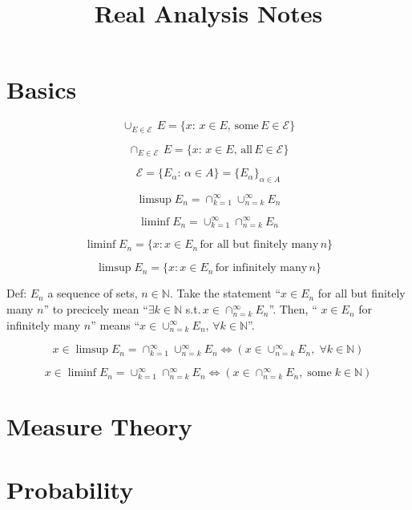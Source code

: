 \documentclass[landscape,twocolumn,letterpaper]{book}
\title{Real Analysis Notes}
\begin{document}
\chapter{Basics}

\begin{equation*}
\cup_{E \in \mathcal{E} } \, E = \{ x : \, x\in E, \, \textrm{some} \, E \in \mathcal{E}  \}
\end{equation*}

\begin{equation*}
\cap_{E \in \mathcal{E} } \, E = \{ x : \, x\in E, \, \textrm{all} \, E \in \mathcal{E}  \}
\end{equation*}

\begin{equation*}
 \mathcal{E} = \{ E_\alpha : \, \alpha \in A \} = \{E_\alpha \}_{\alpha \in A}
\end{equation*}

\begin{equation*}
\limsup E_n = \cap_{k=1}^{\infty} \cup_{n=k}^{\infty} E_n
\end{equation*}

\begin{equation*}
\liminf E_n = \cup_{k=1}^{\infty} \cap_{n=k}^{\infty} E_n
\end{equation*}

\begin{equation*}
\liminf E_n = \{ x : x \in E_n \, \textrm{for all but finitely many} \, n \}
\end{equation*}

\begin{equation*}
\limsup E_n = \{ x : x \in E_n \, \textrm{for infinitely many} \, n \}
\end{equation*}

\begin{flushleft}
Def: $E_n$ a sequence of sets, $n \in \mathbb{N}$. Take the statement ``$x \in E_n$ for all but finitely many $n$'' to precicely mean ``$\exists k \in \mathbb{N}$ s.t.$ \, x \in \cap_{n=k}^{\infty} E_n $''. Then, `` $x \in E_n$ for infinitely many $n$'' means ``$ x \in \cup_{n=k}^{\infty} E_n,\, \forall k \in \mathbb{N}$''.
\end{flushleft}

\begin{equation*}
x \in \limsup E_n = \cap_{k=1}^{\infty} \cup_{n=k}^{\infty} E_n \Leftrightarrow \left( x \in \cup_{n=k}^{\infty} E_n, \; \forall k \in \mathbb{N} \right)
\end{equation*}

\begin{equation*}
x \in \liminf E_n = \cup_{k=1}^{\infty} \cap_{n=k}^{\infty} E_n \Leftrightarrow \left( x \in \cap_{n=k}^{\infty} E_n, \; \textrm{some} \; k \in \mathbb{N} \right)
\end{equation*}

\chapter{Measure Theory}

\chapter{Probability}
\end{document}
